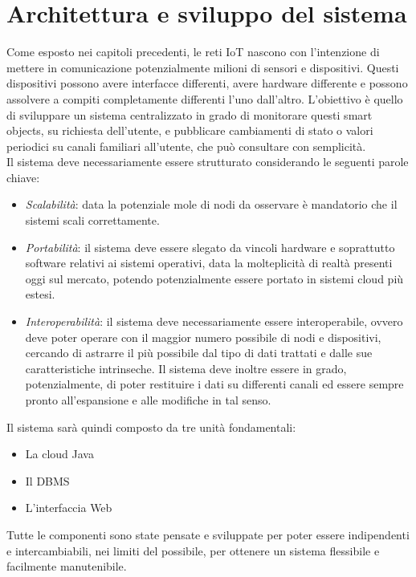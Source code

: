 \chapter{Architettura e sviluppo del sistema}
Come esposto nei capitoli precedenti, le reti IoT nascono con l'intenzione di mettere in comunicazione potenzialmente milioni di sensori e dispositivi. Questi dispositivi possono avere interfacce differenti, avere hardware differente e possono assolvere a compiti completamente differenti l'uno dall'altro. L'obiettivo è quello di sviluppare un sistema centralizzato in grado di monitorare questi smart objects, su richiesta dell'utente, e pubblicare cambiamenti di stato o valori periodici su canali familiari all'utente, che può consultare con semplicità.
\\Il sistema deve necessariamente essere strutturato considerando le seguenti parole chiave:
\begin{itemize}
\item \emph{Scalabilità}: data la potenziale mole di nodi da osservare è mandatorio che il sistemi scali correttamente.
\item \emph{Portabilità}: il sistema deve essere slegato da vincoli hardware e soprattutto software relativi ai sistemi operativi, data la molteplicità di realtà presenti oggi sul mercato, potendo potenzialmente essere portato in sistemi cloud più estesi.
\item \emph{Interoperabilità}: il sistema deve necessariamente essere interoperabile, ovvero deve poter operare con il maggior numero possibile di nodi e dispositivi, cercando di astrarre il più possibile dal tipo di dati trattati e dalle sue caratteristiche intrinseche. Il sistema deve inoltre essere in grado, potenzialmente, di poter restituire i dati su differenti canali ed essere sempre pronto all'espansione e alle modifiche in tal senso.
\end{itemize}
Il sistema sarà quindi composto da tre unità fondamentali:
\begin{itemize}
\item La cloud Java
\item Il DBMS
\item L'interfaccia Web
\end{itemize}
Tutte le componenti sono state pensate e sviluppate per poter essere indipendenti e intercambiabili, nei limiti del possibile, per ottenere un sistema flessibile e facilmente manutenibile.
\vspace{1.0cm}
